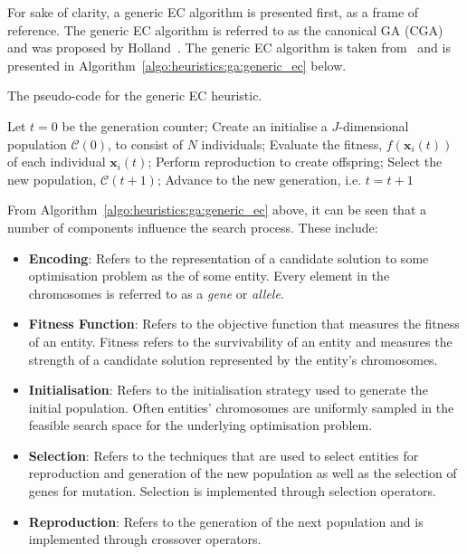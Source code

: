 For sake of clarity, a generic \acs{EC} algorithm is presented first, as a frame of reference. The generic \acs{EC} algorithm is referred to as the canonical \acs{GA} (CGA) and was proposed by Holland~\cite{ref:holland:1992}. The generic \acs{EC} algorithm is taken from~\cite{ref:engelbrecht:2007} and is presented in Algorithm~\ref{algo:heuristics:ga:generic_ec} below.

\begin{algorithm}[htb]
	\caption{The pseudo-code for the generic \acs{EC} heuristic.}
	\label{algo:heuristics:ga:generic_ec}
	\begin{algorithmic}
		\State Let $t = 0$ be the generation counter;
		\State Create an initialise a $J$-dimensional population $\mathcal{C}(0)$, to consist of $N$ individuals;
		\State Evaluate the fitness, $f(\boldsymbol{x}_{i}(t))$ of each individual $\boldsymbol{x}_{i}(t)$;
		\State Perform reproduction to create offspring;
		\State Select the new population, $\mathcal{C}(t+1)$;
		\State Advance to the new generation, i.e. $t = t + 1$
		\EndWhile
		\State
	\end{algorithmic}
\end{algorithm}

From Algorithm~\ref{algo:heuristics:ga:generic_ec} above, it can be seen that a number of components influence the search process. These include:

\begin{itemize}
	\item \textbf{Encoding}: Refers to the representation of a candidate solution to some optimisation problem as the  of some entity. Every element in the chromosomes is referred to as a \textit{gene} or \textit{allele}.

	\item \textbf{Fitness Function}: Refers to the objective function that measures the fitness of an entity. Fitness refers to the survivability of an entity and measures the strength of a candidate solution represented by the entity's chromosomes.

	\item \textbf{Initialisation}: Refers to the initialisation strategy used to generate the initial population. Often entities' chromosomes are uniformly sampled in the feasible search space for the underlying optimisation problem.

	\item \textbf{Selection}: Refers to the techniques that are used to select entities for reproduction and generation of the new population as well as the selection of genes for mutation. Selection is implemented through selection operators.

	\item \textbf{Reproduction}: Refers to the generation of the next population and is implemented through crossover operators.
\end{itemize}

